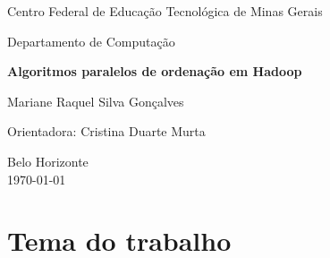 \documentclass[brazil, a4paper,12pt]{article}
\begin{document}


\begin{titlepage}

  \vfill

  \begin{center}
    \begin{large}
      Centro Federal de Educação Tecnológica de Minas Gerais
    \end{large}
  \end{center}

  \begin{center}
    \begin{large}
      Departamento de Computação
    \end{large}
  \end{center}

  \vfill

  \begin{center}
    \begin{Large}
      \textbf{Algoritmos paralelos de ordenação em Hadoop} \\[1.4cm]            
    \end{Large}
  \end{center}


  \vfill

  \begin{center}
    \begin{large}
      Mariane Raquel Silva Gonçalves	
    \end{large}
  \end{center}

  \begin{center}
    \begin{large}
      Orientadora: Cristina Duarte Murta
    \end{large}
  \end{center}

  \vfill

  \begin{center}
    \begin{large}
      Belo Horizonte \\
      \today \\
    \end{large}
  \end{center}

\clearpage
\tableofcontents 
\end{titlepage}


\section{Tema do trabalho}
\end{document}

